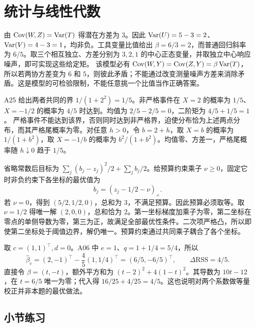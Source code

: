 \section{统计与线性代数}

由 $\operatorname{Cov}(W,Z)=\operatorname{Var}(T)$ 得潜在方差为 $3$。因此 $\operatorname{Var}(U)=5-3=2$、$\operatorname{Var}(V)=4-3=1$，均非负。工具变量比值给出 $\beta=6/3=2$，而普通回归斜率为 $6/5$。取三个相互独立、方差分别为 $3,2,1$ 的中心正态变量，并取独立中心响应噪声，即可实现这些给定矩。
该模型必有 $\operatorname{Cov}(W,Y)=\operatorname{Cov}(Z,Y)=\beta\operatorname{Var}(T)$，所以若两协方差变为 $6$ 和 $5$，则彼此矛盾；不能通过改变测量噪声方差来消除矛盾。这是模型的可检验限制，不能任意挑一个比值当作正确答案。

A25 给出两者共同的界 $1/(1+2^2)=1/5$。非严格事件在 $X=2$ 的概率为 $1/5$、$X=-1/2$ 的概率为 $4/5$ 时达到。均值为 $2/5-2/5=0$，二阶矩为 $4/5+1/5=1$。
严格事件不能达到该界，否则同时达到非严格界，迫使分布恰为上述两点分布，而其严格尾概率为零。对任意 $h>0$，令 $b=2+h$，取 $X=b$ 的概率为 $1/(1+b^2)$，取 $X=-1/b$ 的概率为 $b^2/(1+b^2)$。均值零、方差一，严格尾概率随 $h\downarrow0$ 趋于 $1/5$。

省略常数后目标为 $\sum_j(b_j-z_j)^2/2+\sum_jb_j/2$。给预算约束乘子 $\nu\ge0$，固定它时非负约束下各坐标的最优值为
\[
 b_j=(z_j-1/2-\nu)_+.
\]
若 $\nu=0$，得到 $(5/2,1/2,0)$，总和为 $3$，不满足预算。因此预算必须取等。取 $\nu=1/2$ 得唯一解 $(2,0,0)$，总和恰为 $2$。第一坐标梯度加乘子为零，第二坐标在零点的单侧导数为零，第三为正，故满足全部最优性条件。二次项严格凸，所以即使第二坐标处于阈值边界，解仍唯一。预算约束通过共同乘子耦合了各个坐标。

取 $c=(1,1)^\top,d=0$。A06 中 $e=1$、$q=1+1/4=5/4$，所以
\[
 \widehat\beta_c=(2,-1)^\top-\frac45(1,1/4)^\top
 =(6/5,-6/5)^\top,
 \qquad\Delta\mathrm{RSS}=4/5.
\]
直接令 $\beta=(t,-t)$，额外平方和为 $(t-2)^2+4(1-t)^2$。其导数为 $10t-12$，在 $t=6/5$ 唯一为零；代入得 $16/25+4/25=4/5$。这也说明对两个系数做等量校正并非本题的最优做法。

\par{}
\subsection*{小节练习}




